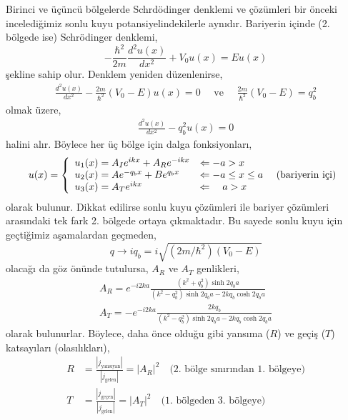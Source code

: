 \documentclass[a4paper,12pt, twoside]{article}
\begin{document}
Birinci ve üçüncü bölgelerde Schrdödinger denklemi ve çözümleri bir önceki incelediğimiz sonlu kuyu potansiyelindekilerle aynıdır. Bariyerin içinde (2. bölgede ise) Schrödinger denklemi, 
\begin{equation}
- \frac { \hbar ^ { 2 } } { 2 m } \frac { d ^ { 2 } u ( x ) } { d x ^ { 2 } } + V_0 u ( x ) = E u ( x )
\end{equation}
şekline sahip olur. Denklem yeniden düzenlenirse, 
\begin{align}
\frac { d ^ { 2 } u ( x ) } { d x ^ { 2 } } -  \frac { 2 m} { \hbar ^ { 2 } }  \left(V _ { 0 }-E \right) u ( x ) = 0 \quad \text{ ve } \quad \frac { 2 m} { \hbar ^ { 2 } }  \left(V _ { 0 } - E \right) = q_b ^ { 2 }
\end{align}
olmak üzere, 
\begin{align}
\frac { d ^ { 2 } u ( x ) } { d x ^ { 2 } } -  q_b^2 u ( x ) = 0
\end{align}
halini alır. Böylece her üç bölge için dalga fonksiyonları,
\begin{align}
u ( x )  = \left\{ 
\begin{array} { l l } 
{u_1(x) = A_I e^{i k x} + A_R e^{-i k x} } & {\Leftarrow -a > x } \\
{u_2(x) = A e^{- q_b x} + B e^{q_b x} } & {\Leftarrow -a \leq x \leq a } \quad \text{ (bariyerin içi)} \\
{u_3(x) = A_T e^{i k x}} & {\Leftarrow \quad a > x }
\end{array} \right. 
\end{align}
olarak bulunur. Dikkat edilirse sonlu kuyu çözümleri ile bariyer çözümleri arasındaki tek fark 2. bölgede ortaya çıkmaktadır. Bu sayede sonlu kuyu için geçtiğimiz aşamalardan geçmeden,
\begin{equation}
q \rightarrow i q_b = i \sqrt{\left(2 m / \hbar^{2}\right)\left(V_{0}-E\right)}
\end{equation}
olacağı da göz önünde tutulursa, $A_R$ ve $A_T$ genlikleri,
\begin{align}
{A_R= e^{-i 2 k a} \frac{\left(k^{2}+q_b^{2}\right) \sinh 2 q_b a}{\left(k^{2}-q_b^{2}\right) \sinh 2 q_b a - 2 k q_b \cosh 2 q_b a}} \\ 
{A_T= -e^{-i 2 k a} \frac{2 k q_b}{\left(k^{2}-q_b^{2}\right) \sinh 2 q_b a - 2 k q_b \cosh 2 q_b a}}
\end{align}
olarak bulunurlar. Böylece, daha önce olduğu gibi yansıma ($R$) ve geçiş ($T$) katsayıları (olasılıkları),
\begin{align}
R &= \frac{|j_\text{yansıyan}|}{|j_\text{gelen}|} = |A_R|^2 \quad \text{(2. bölge sınırından 1. bölgeye)}\\
T &= \frac{|j_\text{geçen}|}{|j_\text{gelen}|} = |A_T|^2  \quad \text{(1. bölgeden 3. bölgeye)}
\end{align}
\end{document}
